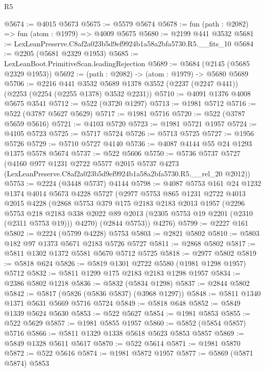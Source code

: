 \begin{lexlean}{R5}
\begin{coremodule}
@5674 := @4015 @5673
@5675 := @5579 @5674
@5678 := fun (path : @2082) => fun (atom : @1979) => @4009 @5675
@5680 := @2199 @441 @3532
@5681 := LexLeanPreserve.C8af2a023b5d9ef9924b1a58a2bfa5730.R5.__fits_10
@5684 := @2205 (@5681 @2329 @1953)
@5685 := LexLeanBoot.PrimitiveScan.leadingRejection
@5689 := @5684 (@2145 (@5685 @2329 @1953))
@5692 := (path : @2082) -> (atom : @1979) -> @5680 @5689
@5706 := @2216
    @441
    @3532
    @5689
    @1378
    @3552
    (@2237 (@2247 @441))
    (@2253 (@2254 (@2255 @1378) @3532 @2231))
@5710 := @4091 @1376 @4008 @5675 @3541
@5712 := @522 (@3720 @1297)
@5713 := @1981 @5712
@5716 := @522 (@3787 @5627 @5629)
@5717 := @1981 @5716
@5720 := @522 (@3787 @5659 @5616)
@5721 := @4103 @5720
@5723 := @1981 @5721 @1957
@5724 := @4105 @5723
@5725 := @5717 @5724
@5726 := @5713 @5725
@5727 := @1956 @5726
@5729 := @5710 @5727 @4140
@5736 := @4087 @4144 @55 @24 @1293 @1375 @5578 @5674
@5737 := @522 @5606
@5750 := @5736
    @5737
    @5727
    (@4160
      @977
      @1231
      @2722
      @5577
      @2015
      @5737
      @4273
      (LexLeanPreserve.C8af2a023b5d9ef9924b1a58a2bfa5730.R5.__rel_20 @2012))
@5753 := @2224 (@3448 @5737) @4144
@5798 := @4087
    @5753
    @161
    @24
    @1232
    @1374
    @4014
    @5673
    @4228
    @5727
    (@2977
      @5753
      @865
      @1231
      @2722
      @4013
      @2015
      @4228
      (@2868
        @5753
        @379
        @175
        @2183
        @2183
        @2013
        @1957
        (@2296
          @5753
          @218
          @2183
          @338
          @2022
          @89
          @2013
          (@2305 @5753 @19 @2201 (@2310 (@2311 @5753 @19)))
          @4270)
        (@2844 @5753))
      @4276)
@5799 := @2227 @161
@5802 := @2224 (@5799 @4228) @5753
@5803 := @2821 @5802
@5810 := @5803 @182 @97 @1373 @5671 @2183 @5726 @5727
@5811 := @2868 @5802
@5817 := @5811 @1302 @1372 @5581 @5670 @5712 @5725
@5818 := @2977 @5802
@5819 := @5818 @624
@5826 := @5819 @1301 @2722 @5580 (@1981 @1298 @1957) @5712
@5832 := @5811 @1299 @175 @2183 @2183 @1298 @1957
@5834 := @2386 @5802 @1218
@5836 := @5832 (@5834 @1298)
@5837 := @2844 @5802
@5842 := @5817 (@5826 (@5836 @5837) (@3968 @1297))
@5848 := @5811 @1340 @1371 @5631 @5669 @5716 @5724
@5849 := @5818 @648
@5852 := @5849 @1339 @5624 @5630
@5853 := @522 @5627
@5854 := @1981 @5853
@5855 := @522 @5629
@5857 := @1981 @5855 @1957
@5860 := @5852 (@5854 @5857) @5716
@5866 := @5811 @1329 @1338 @5618 @5623 @5853 @5857
@5869 := @5849 @1328 @5611 @5617
@5870 := @522 @5614
@5871 := @1981 @5870
@5872 := @522 @5616
@5874 := @1981 @5872 @1957
@5877 := @5869 (@5871 @5874) @5853

\end{coremodule}
\end{lexlean}
